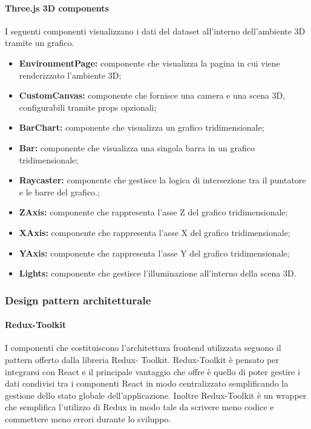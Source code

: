 \paragraph{Three.js 3D components}
    I seguenti componenti visualizzano i dati del dataset all'interno dell'ambiente 3D tramite un grafico.
    \begin{itemize}
        \item \textbf{EnvironmentPage:} componente che visualizza la pagina in cui viene renderizzato l'ambiente 3D;
        \item \textbf{CustomCanvas:} componente che fornisce una camera e una scena 3D, configurabili tramite props opzionali;
        \item \textbf{BarChart:} componente che visualizza un grafico tridimensionale;
        \item \textbf{Bar:} componente che visualizza una singola barra in un grafico tridimensionale;
        \item \textbf{Raycaster:} componente che gestisce la logica di intersezione tra il puntatore e le barre del grafico.;
        \item \textbf{ZAxis:} componente che rappresenta l'asse Z del grafico tridimensionale;
        \item \textbf{XAxis:} componente che rappresenta l'asse X del grafico tridimensionale;
        \item \textbf{YAxis:} componente che rappresenta l'asse Y del grafico tridimensionale;
        \item \textbf{Lights:} componente che gestisce l'illuminazione all'interno della scena 3D.
    \end{itemize}

\subsubsection{Design pattern architetturale}

\paragraph{Redux-Toolkit}
I componenti che costituiscono l’architettura frontend utilizzata seguono il pattern offerto dalla libreria Redux-
Toolkit.
Redux-Toolkit è pensato per integrarsi con React e il principale vantaggio che offre è quello di poter
gestire i dati condivisi tra i componenti React in modo centralizzato semplificando la gestione dello stato
globale dell’applicazione.
Inoltre Redux-Toolkit è un wrapper che semplifica l'utilizzo di Redux in modo tale da scrivere meno codice e commettere meno errori durante lo sviluppo.


